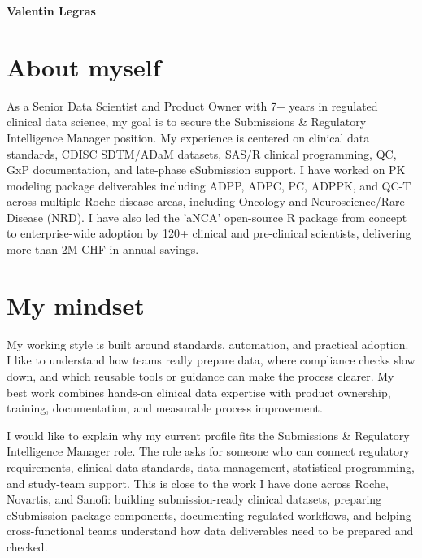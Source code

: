 \documentclass[11pt,a4paper]{article}
\newcommand{\Position}{Submissions \& Regulatory Intelligence Manager}
\begin{document}
{\Large\bfseries\color{accent} Valentin Legras}\\[10pt]

\section{About myself}
As a Senior Data Scientist and Product Owner with 7+ years in regulated clinical
data science, my goal is to secure the \Position{} position. My experience is
centered on clinical data standards, CDISC SDTM/ADaM datasets, SAS/R clinical
programming, QC, GxP documentation, and late-phase eSubmission support. I have
worked on PK modeling package deliverables including ADPP, ADPC, PC, ADPPK, and
QC-T across multiple Roche disease areas, including Oncology and
Neuroscience/Rare Disease (NRD). I have also led the 'aNCA' open-source R
package from concept to enterprise-wide adoption by 120+ clinical and
pre-clinical scientists, delivering more than 2M CHF in annual savings.

\section{My mindset}
My working style is built around standards, automation, and practical adoption.
I like to understand how teams really prepare data, where compliance checks slow
down, and which reusable tools or guidance can make the process clearer. My best
work combines hands-on clinical data expertise with product ownership, training,
documentation, and measurable process improvement.

I would like to explain why my current profile fits the \Position{} role. The
role asks for someone who can connect regulatory requirements, clinical data
standards, data management, statistical programming, and study-team support. This
is close to the work I have done across Roche, Novartis, and Sanofi: building
submission-ready clinical datasets, preparing eSubmission package components,
documenting regulated workflows, and helping cross-functional teams understand
how data deliverables need to be prepared and checked.
\end{document}
